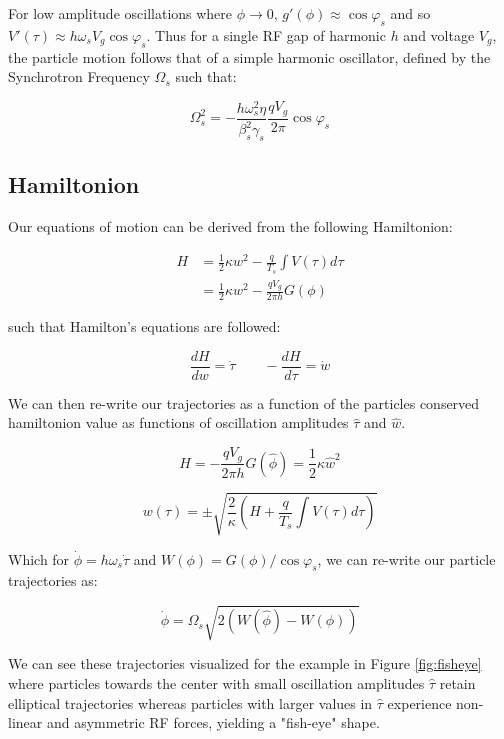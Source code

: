 For low amplitude oscillations where $\phi \to 0$, $g'(\phi) \approx \cos\varphi_s$ and so $V'(\tau)\approx h\omega_s V_g \cos\varphi_s$. Thus for a single RF gap of harmonic $h$ and voltage $V_g$, the particle motion follows that of a simple harmonic oscillator, defined by the Synchrotron Frequency $\Omega_s$ such that:

\begin{equation}
    \Omega_s^2 = -\frac{h\omega_s^2\eta}{\beta_s^2\gamma_s}\frac{qV_g}{2\pi}\cos\varphi_s
    \label{eq:synchrotron_frequency}
\end{equation}

\subsection{Hamiltonion}

Our equations of motion can be derived from the following Hamiltonion:

$$\begin{aligned}
        H & = \frac{1}{2}\kappa w^2 -\frac{q}{T_s}\int V(\tau)d\tau \\
          & = \frac{1}{2}\kappa w^2 -\frac{q V_g}{2\pi h}G(\phi)
    \end{aligned}$$

such that Hamilton's equations are followed:

$$\frac{dH}{dw} = \dot{\tau} \qquad -\frac{dH}{d\tau} = \dot{w}$$

We can then re-write our trajectories as a function of the particles conserved hamiltonion value as functions of oscillation amplitudes $\hat{\tau}$ and $\hat{w}$.

$$H = -\frac{qV_g}{2\pi h}G(\hat{\phi}) = \frac{1}{2}\kappa \hat{w}^2$$

$$w(\tau) = \pm \sqrt{\frac{2}{\kappa}\left(H+\frac{q}{T_s}\int V(\tau) d\tau\right)}$$

Which for $\dot{\phi} = h\omega_s\dot{\tau}$ and $W(\phi) = G(\phi)/\cos\varphi_s$, we can re-write our particle trajectories as:

$$\dot{\phi} = \Omega_s\sqrt{2(W(\hat{\phi})-W(\phi))}$$

We can see these trajectories visualized for the example in Figure \ref{fig:fisheye} where particles towards the center with small oscillation amplitudes $\hat{\tau}$ retain elliptical trajectories whereas particles with larger values in $\hat{\tau}$ experience non-linear and asymmetric RF forces, yielding a "fish-eye" shape.

